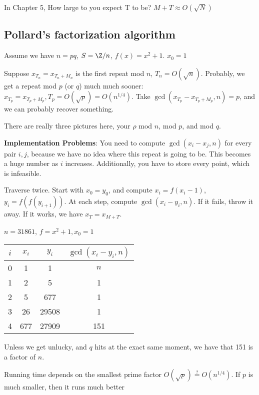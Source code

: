 \documentclass[twoside, 10pt]{article}
\begin{document}
\begin{rmk}
    In Chapter 5, How large to you expect T to be? $M + T \approx O(\sqrt{N})$
\end{rmk}

\subsection{Pollard's factorization algorithm} Assume we have $n = pq$, $S = \Z /n$, $f(x) = x^2 + 1$. $x_0 = 1$

Suppose $x_{T_n} = x_{T_n + M_n}$ is the first repeat mod $n$, $T_n = O(\sqrt{n})$. Probably, we get a repeat mod $p$ (or $q$) much much sooner: $x_{T_p} = x_{T_p + M_p}, T_p = O(\sqrt{p}) = O(n^{1/4})$. Take $\gcd(x_{T_p} - x_{T_p + M_p}, n) = p$, and we can probably recover something. 

There are really three pictures here, your $\rho$ mod $n$, mod $p$, and mod $q$.

\textbf{Implementation Problems}: You need to compute $\gcd(x_i - x_j, n)$ for every pair $i, j$, because we have no idea where this repeat is going to be. This becomes a huge number as $i$ increases. Additionally, you have to store every point, which is infeasible.

\begin{defn}
    Traverse twice. Start with $x_0 = y_0$, and compute $x_i = f(x_i - 1)$, $y_i = f(f(y_{i + 1}))$. At each step, compute $\gcd(x_i - y_i, n)$. If it fails, throw it away. If it works, we have $x_T = x_{M + T}$.
\end{defn}

\begin{exm*}
    $n = 31861$, $f = x^2 + 1, x_0 = 1$
\end{exm*}

\begin{tabular}{c|c|c|c}
    $i$ & $x_i$ & $y_i$ & $\gcd(x_i - y_i, n)$\\
    \hline
    0 & 1 & 1 & $n$\\
    1 & 2 & 5 & 1\\
    2 & 5 & 677 & 1\\
    3 & 26 & 29508& 1\\
    4 & 677 &  27909 & 151\\
\end{tabular}

Unless we get unlucky, and $q$ hits at the exact same moment, we have that 151 is a factor of $n$.

Running time depends on the smallest prime factor $O(\sqrt{p}) \stackrel{?}{=} O(n^{1/4})$. If $p$ is much smaller, then it runs much better
\end{document}

